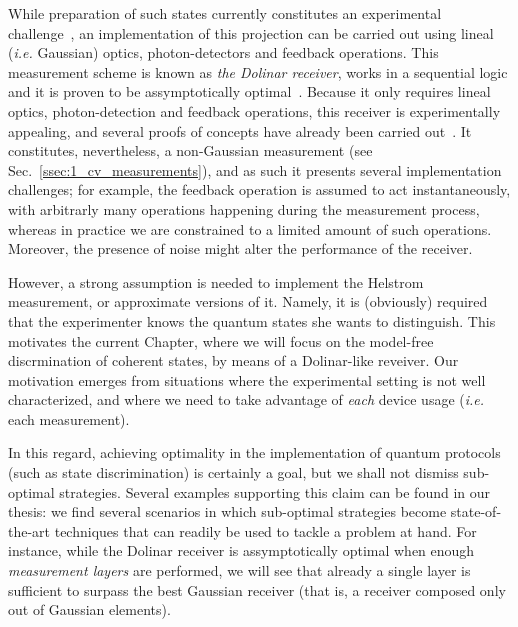 While preparation of such states currently constitutes an experimental challenge~\cite{catstates0,catsates1_RL}, an implementation of this projection can be carried out using lineal (\textit{i.e.} Gaussian) optics, photon-detectors and feedback operations. This measurement scheme is known as \textit{the Dolinar receiver}, works in a sequential logic and it is proven to be assymptotically optimal~\cite{Dolinar,Takeoka2005}. Because it only requires lineal optics, photon-detection and feedback operations, this receiver is experimentally appealing, and several proofs of concepts have already been carried out~\cite{Cook2007,Geremia2004,DaSilva2013,DiMario2018}. It constitutes, nevertheless, a non-Gaussian measurement (see Sec.~\ref{ssec:1_cv_measurements}), and as such it presents several implementation challenges; for example, the feedback operation is assumed to act instantaneously, with arbitrarly many operations happening during the measurement process, whereas in practice we are constrained to a limited amount of such operations. Moreover, the presence of noise might alter the performance of the receiver.

However, a strong assumption is needed to implement the Helstrom measurement, or approximate versions of it. Namely, it is (obviously) required that the experimenter knows the quantum states she wants to distinguish. This motivates the current Chapter, where we will focus on the model-free discrmination of coherent  states, by means of a Dolinar-like reveiver. Our motivation emerges from situations where the experimental setting is not well characterized, and where we need to take advantage of \textit{each} device usage (\textit{i.e.} each measurement).


In this regard, achieving optimality in the implementation of quantum protocols (such as state discrimination) is certainly a goal, but we shall not dismiss sub-optimal strategies. Several examples supporting this claim can be found in our thesis: we find several scenarios in which sub-optimal strategies become state-of-the-art techniques that can readily be used to tackle a problem at hand. For instance, while the Dolinar receiver is assymptotically optimal when enough \textit{measurement layers} are performed, we will see that already a single layer is sufficient to surpass the best Gaussian receiver (that is, a receiver composed only out of Gaussian elements).

